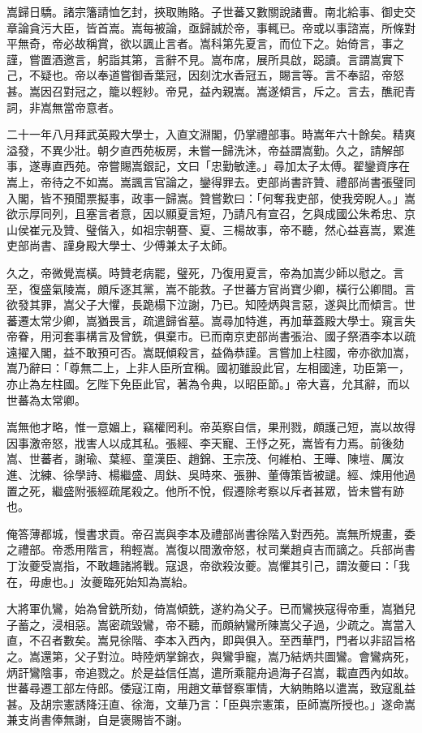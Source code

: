 \begin{pinyinscope}
嵩歸日驕。諸宗籓請恤乞封，挾取賄賂。子世蕃又數關說諸曹。南北給事、御史交章論貪污大臣，皆首嵩。嵩每被論，亟歸誠於帝，事輒已。帝或以事諮嵩，所條對平無奇，帝必故稱賞，欲以諷止言者。嵩科第先夏言，而位下之。始倚言，事之謹，嘗置酒邀言，躬詣其第，言辭不見。嵩布席，展所具啟，跽讀。言謂嵩實下己，不疑也。帝以奉道嘗御香葉冠，因刻沈水香冠五，賜言等。言不奉詔，帝怒甚。嵩因召對冠之，籠以輕紗。帝見，益內親嵩。嵩遂傾言，斥之。言去，醮祀青詞，非嵩無當帝意者。

二十一年八月拜武英殿大學士，入直文淵閣，仍掌禮部事。時嵩年六十餘矣。精爽溢發，不異少壯。朝夕直西苑板房，未嘗一歸洗沐，帝益謂嵩勤。久之，請解部事，遂專直西苑。帝嘗賜嵩銀記，文曰「忠勤敏達。」尋加太子太傅。翟鑾資序在嵩上，帝待之不如嵩。嵩諷言官論之，鑾得罪去。吏部尚書許贊、禮部尚書張璧同入閣，皆不預聞票擬事，政事一歸嵩。贊嘗歎曰：「何奪我吏部，使我旁睨人。」嵩欲示厚同列，且塞言者意，因以顯夏言短，乃請凡有宣召，乞與成國公朱希忠、京山侯崔元及贊、璧偕入，如祖宗朝謇、夏、三楊故事，帝不聽，然心益喜嵩，累進吏部尚書、謹身殿大學士、少傅兼太子太師。

久之，帝微覺嵩橫。時贊老病罷，璧死，乃復用夏言，帝為加嵩少師以慰之。言至，復盛氣陵嵩，頗斥逐其黨，嵩不能救。子世蕃方官尚寶少卿，橫行公卿間。言欲發其罪，嵩父子大懼，長跪榻下泣謝，乃已。知陸炳與言惡，遂與比而傾言。世蕃遷太常少卿，嵩猶畏言，疏遣歸省墓。嵩尋加特進，再加華蓋殿大學士。窺言失帝眷，用河套事構言及曾銑，俱棄市。已而南京吏部尚書張治、國子祭酒李本以疏遠擢入閣，益不敢預可否。嵩既傾殺言，益偽恭謹。言嘗加上柱國，帝亦欲加嵩，嵩乃辭曰：「尊無二上，上非人臣所宜稱。國初雖設此官，左相國達，功臣第一，亦止為左柱國。乞陛下免臣此官，著為令典，以昭臣節。」帝大喜，允其辭，而以世蕃為太常卿。

嵩無他才略，惟一意媚上，竊權罔利。帝英察自信，果刑戮，頗護己短，嵩以故得因事激帝怒，戕害人以成其私。張經、李天寵、王忬之死，嵩皆有力焉。前後劾嵩、世蕃者，謝瑜、葉經、童漢臣、趙錦、王宗茂、何維柏、王曄、陳塏、厲汝進、沈練、徐學詩、楊繼盛、周鈇、吳時來、張翀、董傳策皆被譴。經、煉用他過置之死，繼盛附張經疏尾殺之。他所不悅，假遷除考察以斥者甚眾，皆未嘗有跡也。

俺答薄都城，慢書求貢。帝召嵩與李本及禮部尚書徐階入對西苑。嵩無所規畫，委之禮部。帝悉用階言，稍輕嵩。嵩復以間激帝怒，杖司業趙貞吉而謫之。兵部尚書丁汝夔受嵩指，不敢趣諸將戰。寇退，帝欲殺汝夔。嵩懼其引己，謂汝夔曰：「我在，毋慮也。」汝夔臨死始知為嵩紿。

大將軍仇鸞，始為曾銑所劾，倚嵩傾銑，遂約為父子。已而鸞挾寇得帝重，嵩猶兒子蓄之，浸相惡。嵩密疏毀鸞，帝不聽，而頗納鸞所陳嵩父子過，少疏之。嵩當入直，不召者數矣。嵩見徐階、李本入西內，即與俱入。至西華門，門者以非詔旨格之。嵩還第，父子對泣。時陸炳掌錦衣，與鸞爭寵，嵩乃結炳共圖鸞。會鸞病死，炳訐鸞陰事，帝追戮之。於是益信任嵩，遣所乘龍舟過海子召嵩，載直西內如故。世蕃尋遷工部左侍郎。倭寇江南，用趙文華督察軍情，大納賄賂以遣嵩，致寇亂益甚。及胡宗憲誘降汪直、徐海，文華乃言：「臣與宗憲策，臣師嵩所授也。」遂命嵩兼支尚書俸無謝，自是褒賜皆不謝。


\end{pinyinscope}
